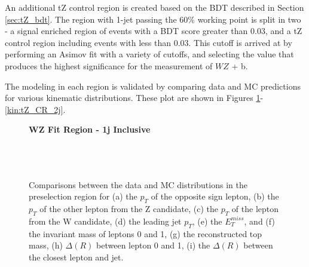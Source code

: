 An additional tZ control region is created based on the BDT described in Section \ref{sec:tZ_bdt}. The region with 1-jet passing the 60\% working point is split in two - a signal enriched region of events with a BDT score greater than 0.03, and a tZ control region including events with less than 0.03. This cutoff is arrived at by performing an Asimov fit with a variety of cutoffs, and selecting the value that produces the highest significance for the measurement of $WZ$ + b.

The modeling in each region is validated by comparing data and MC predictions for various kinematic distributions. These plot are shown in Figures \ref{kin:WP_1j_inc}-\ref{kin:tZ_CR_2j}.



\begin{figure}[H] 
    \centering
    \textbf{WZ Fit Region - 1j Inclusive}\\                                                                                  
    \\                     
    \\                     
    \\ 
    \caption{Comparisons between the data and MC distributions in the preselection region for (a) the $p_T$ of the opposite sign lepton, (b) the $p_T$ of the other lepton from the Z candidate, (c) the $p_T$ of the lepton from the W candidate, (d) the leading jet $p_T$, (e) the $E_T^{miss}$, and (f) the invariant mass of leptons 0 and 1, (g) the reconstructed top mass, (h) $\Delta(R)$  between lepton 0 and 1, (i) the $\Delta(R)$ between the closest lepton and jet.}                                      
    \label{kin:WP_1j_inc}                                                                                                    
\end{figure}

